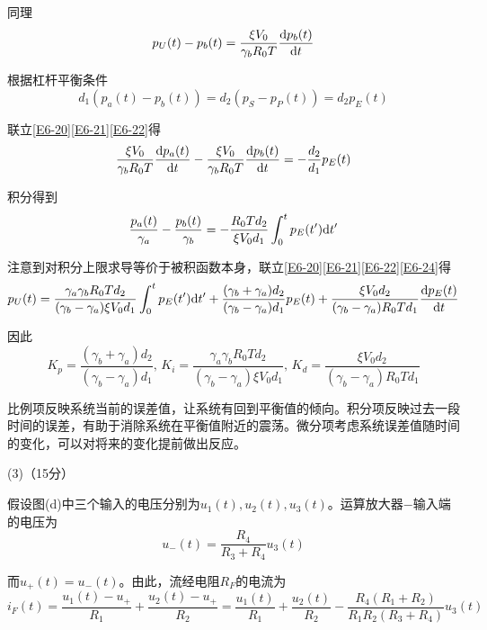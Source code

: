 \documentclass[10pt,a4paper,onecolumn,UTF8]{ctexart}
\begin{document}
	同理
	\begin{equation}\label{E6-21}
		p_U(t)-p_b(t)=\frac{\xi V_0}{\gamma_bR_0T}\frac{\mathrm{d} p_b(t)}{\mathrm{d} t}
	\end{equation}
	
	根据杠杆平衡条件
	\begin{equation}\label{E6-22}
		d_1(p_a(t)-p_b(t))=d_2(p_S-p_P(t))=d_2 p_E(t)
	\end{equation}
	
	联立\eqref{E6-20}\eqref{E6-21}\eqref{E6-22}得
	\begin{equation}\label{E6-23}
		\frac{\xi V_0}{\gamma_bR_0T}\frac{\mathrm{d} p_a(t)}{\mathrm{d} t}-\frac{\xi V_0}{\gamma_bR_0T}\frac{\mathrm{d} p_b(t)}{\mathrm{d} t}=-\frac{d_2}{d_1} p_E(t)
	\end{equation}
	
	积分得到
	\begin{equation}\label{E6-24}
		\frac{p_a(t)}{\gamma_a} -\frac{p_b(t)}{\gamma_b}=-\frac{R_0T d_2}{\xi V_0 d_1}\int_0^t p_E(t')\mathrm{d} t'
	\end{equation}
	
	注意到对积分上限求导等价于被积函数本身，联立\eqref{E6-20}\eqref{E6-21}\eqref{E6-22}\eqref{E6-24}得
	\begin{equation}\label{E6-25}
		p_U(t)=\frac{\gamma_a\gamma_bR_0Td_2}{(\gamma_b-\gamma_a)\xi V_0d_1}\int_0^t p_E(t')\mathrm{d} t'+\frac{(\gamma_b+\gamma_a)d_2}{(\gamma_b-\gamma_a)d_1}p_E(t)+\frac{\xi V_0d_2}{(\gamma_b-\gamma_a)R_0Td_1}\frac{\mathrm{d} p_E(t)}{\mathrm{d} t}
	\end{equation}
	
	因此
	\begin{equation}
		K_p=\frac{(\gamma_b+\gamma_a)d_2}{(\gamma_b-\gamma_a)d_1},\,K_i=\frac{\gamma_a\gamma_bR_0Td_2}{(\gamma_b-\gamma_a)\xi V_0d_1},\,K_d=\frac{\xi V_0d_2}{(\gamma_b-\gamma_a)R_0Td_1}
	\end{equation}
	
	比例项反映系统当前的误差值，让系统有回到平衡值的倾向。积分项反映过去一段时间的误差，有助于消除系统在平衡值附近的震荡。微分项考虑系统误差值随时间的变化，可以对将来的变化提前做出反应。
	
	(3)（15分）
	
	假设图(d)中三个输入的电压分别为$u_1(t),u_2(t),u_3(t)$。运算放大器$-$输入端的电压为
	\begin{equation}
		u_-(t)=\frac{R_4}{R_3+R_4}u_3(t)
	\end{equation}
	
	而$u_+(t)=u_-(t)$。由此，流经电阻$R_F$的电流为
	\begin{equation}
		i_F(t)=\frac{u_1(t)-u_+}{R_1}+\frac{u_2(t)-u_+}{R_2}=\frac{u_1(t)}{R_1}+\frac{u_2(t)}{R_2}-\frac{R_4(R_1+R_2)}{R_1R_2(R_3+R_4)}u_3(t)
	\end{equation}
	
\end{document}

